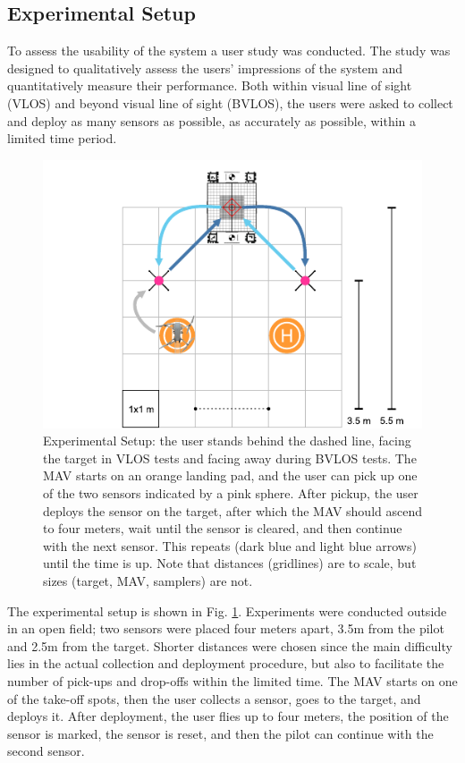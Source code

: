 

\subsection{Experimental Setup}

To assess the usability of the system a user study was conducted. The study was designed to qualitatively assess the users' impressions of the system and quantitatively measure their performance. Both within visual line of sight (VLOS) and beyond visual line of sight (\gls{BVLOS}), the users were asked to collect and deploy as many sensors as possible, as accurately as possible, within a limited time period.


\begin{figure}[!t]
\centering
\includegraphics[width=0.8\columnwidth]{chapters/papers/UR/figures/fig-3-experimental-setup/fig-3-experimental-setup.pdf}
\caption{Experimental Setup: the user stands behind the dashed line, facing the target in VLOS tests and facing away during BVLOS tests. The \gls{MAV} starts on an orange landing pad, and the user can pick up one of the two sensors indicated by a pink sphere. After pickup, the user deploys the sensor on the target, after which the \gls{MAV} should ascend to four meters, wait until the sensor is cleared, and then continue with the next sensor. This repeats (dark blue and light blue arrows) until the time is up. Note that distances (gridlines) are to scale, but sizes (target, \gls{MAV}, samplers) are not.}
\label{fig:fig3-experimental-setup}
\figurevspacebelow
\end{figure}

The experimental setup is shown in Fig. \ref{fig:fig3-experimental-setup}. Experiments were conducted outside in an open field; two sensors were placed four meters apart, 3.5m from the pilot and 2.5m from the target. Shorter distances were chosen since the main difficulty lies in the actual collection and deployment procedure, but also to facilitate the number of pick-ups and drop-offs within the limited time. The \gls{MAV} starts on one of the take-off spots, then the user collects a sensor, goes to the target, and deploys it. After deployment, the user flies up to four meters, the position of the sensor is marked, the sensor is reset, and then the pilot can continue with the second sensor. 

